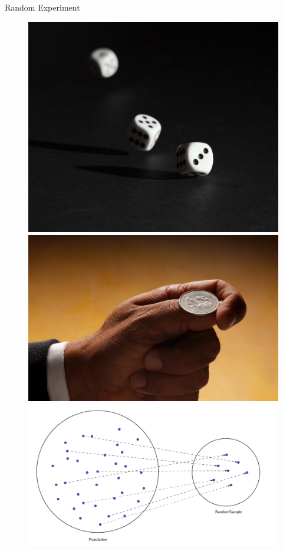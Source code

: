 \documentclass[8pt, usepdftitle = false]{beamer}
\begin{document}
\begin{frame}[allowframebreaks]{Random Experiment}
\begin{itemize}
\begin{figure}
\includegraphics[scale = .055]{Images/dice2.jpg}
\includegraphics[scale = .6]{Images/coin_toss.jpg}
\includegraphics[scale = .1]{Images/Sampling.png}


\end{figure}
\end{itemize}
\end{frame}
\end{document}
